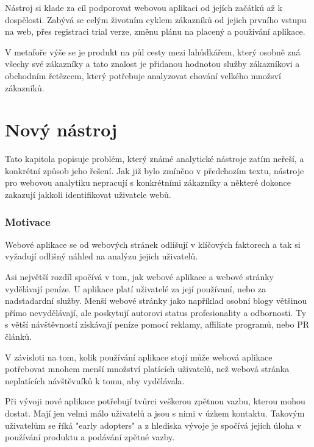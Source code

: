 \documentclass[bc,female,java,dept456]{diploma}						%
\begin{document}
Nástroj si klade za cíl podporovat webovou aplikaci od jejích začátků až k dospělosti. Zabývá se celým životním cyklem zákazníků od jejich prvního vstupu na web, přes registraci trial verze, změnu plánu na placený a používání aplikace.

V metafoře výše se je produkt na půl cesty mezi lahůdkářem, který osobně zná všechy své zákazníky a tato znalost je přidanou hodnotou služby zákazníkovi a obchodním řetězcem, který potřebuje analyzovat chování velkého množsví zákazníků.









\section{Nový nástroj}

Tato kapitola popisuje problém, který známé analytické nástroje zatím neřeší, a konkrétní způsob jeho řešení. Jak již bylo zmíněno v předchozím textu, nástroje pro webovou analytiku nepracují s konkrétními zákazníky a některé dokonce zakazují jakkoli identifikovat uživatele webů.



\subsubsection{Motivace}

Webové aplikace se od webových stránek odlišují v klíčových faktorech a tak si vyžadují odlišný náhled na analýzu jejich uživatelů. 

Asi největší rozdíl spočívá v tom, jak webové aplikace a webové stránky vydělávají peníze. U aplikace platí uživatelé za její používaní, nebo za nadstadardní služby. Menší webové stránky jako například osobní blogy většinou přímo nevydělávají, ale poskytují autorovi status profesionality a odbornosti. Ty s větší návštěvností získávají peníze pomocí reklamy, affiliate programů, nebo PR článků.

V závisloti na tom, kolik používání aplikace stojí může webová aplikace potřebovat mnohem menší množství platících uživatelů, než webová stránka neplatících návštěvníků k tomu, aby vydělávala. 

Při vývoji nové aplikace potřebují tvůrci veškerou zpětnou vazbu, kterou mohou dostat. Mají jen velmi málo uživatelů a jsou s nimi v úzkem kontaktu. Takovým uživatelům se říká "early adopters" a z hlediska vývoje je spočívá jejich úloha v používání produktu a podávání zpětné vazby. 
\end{document}
